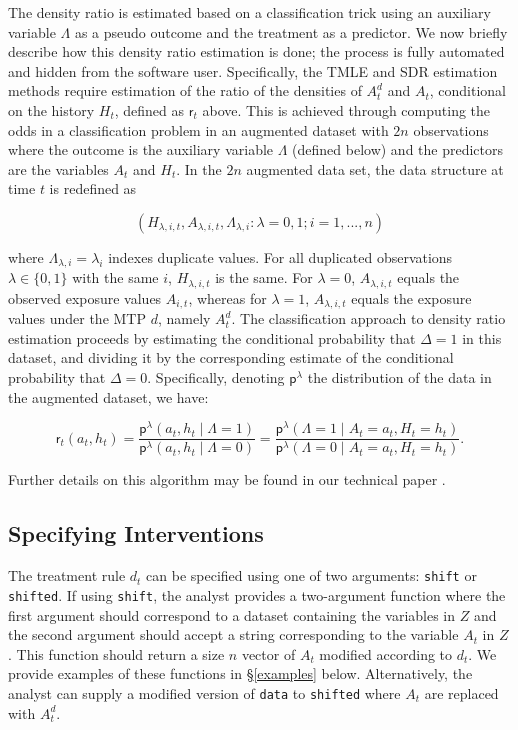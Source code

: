 \documentclass[twoside,11pt]{article}
\renewcommand{\r}{\mathsf{r}}
\newcommand{\p}{\mathsf{p}}
\let\code=\texttt
\begin{document}
The density ratio is estimated based on a classification trick using an auxiliary variable $\Lambda$ as a pseudo outcome and the treatment as a predictor. We now briefly describe how this density ratio estimation is done; the process is fully automated and hidden from the software user. Specifically, the TMLE and SDR estimation methods require estimation of the ratio of the densities of $A_t^d$ and $A_t$, conditional on the history $H_t$, defined as $\r_t$ above. This is achieved through computing the odds in a classification problem in an augmented dataset with $2n$ observations where the outcome is the auxiliary variable $\Lambda$ (defined below) and the predictors are the variables $A_t$ and $H_t$. In the $2n$ augmented data set, the data structure at time $t$ is redefined as

\begin{equation}
(H_{\lambda, i, t}, A_{\lambda, i, t}, \Lambda_{\lambda, i} : \lambda = 0, 1; i = 1, ..., n)
\end{equation}

where $\Lambda_{\lambda, i} = \lambda_i$ indexes duplicate values. For all duplicated observations $\lambda\in\{0,1\}$ with the same $i$, $H_{\lambda, i, t}$ is the same. For $\lambda = 0$, $A_{\lambda, i, t}$ equals the observed exposure values $A_{i, t}$, whereas for $\lambda=1$, $A_{\lambda, i, t}$ equals the exposure values under the MTP $d$, namely $A^{d}_t$. The classification approach to density ratio estimation proceeds by estimating the conditional probability that $\Delta=1$ in this dataset, and dividing it by the corresponding estimate of the conditional probability that $\Delta=0$. Specifically, denoting $\p^\lambda$ the distribution of the data in the augmented dataset, we have:

\[\r_t(a_t, h_t) = \frac{\p^\lambda(a_t, h_t \mid \Lambda =
    1)}{\p^\lambda(a_t, h_t \mid \Lambda =
    0)}=\frac{\p^\lambda(\Lambda = 1\mid A_t=a_t,
    H_t=h_t)}{\p^\lambda(\Lambda = 0\mid A_t=a_t, H_t=h_t)}.\] 
    
Further details on this algorithm may be found in our technical paper \citep{jasaLMTP}.

\hypertarget{shift-functions}{\subsection{Specifying Interventions}\label{shift-functions}}

The treatment rule $d_t$ can be specified using one of two arguments: \code{shift} or \code{shifted}. If using \code{shift}, the analyst provides a two-argument function where the first argument should correspond to a dataset containing the variables in $Z$ and the second argument should accept a string corresponding to the variable $A_t$ in $Z$. This function should return a size $n$ vector of $A_t$ modified according to $d_t$. We provide examples of these functions in \S \ref{examples} below. Alternatively, the analyst can supply a modified version of \code{data} to \code{shifted} where $A_t$ are replaced with $A^d_t$.
\end{document}
